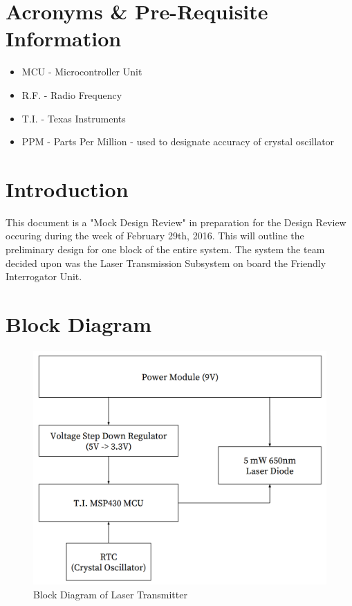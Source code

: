\documentclass[letterpaper,10pt]{article}
\newcommand{\buildtoc}{
	\clearpage
	\singlespacing
	\tableofcontents
	\onehalfspacing
}
\begin{document}
\maketitle
\pagestyle{fancy}
\begin{spacing}{1.15}


\color{black}
\buildtoc
{}
\section*{Acronyms \& Pre-Requisite Information}
\begin{itemize}
	\item MCU - Microcontroller Unit
	\item R.F. - Radio Frequency
	\item T.I. - Texas Instruments
	\item PPM - Parts Per Million - used to designate accuracy of crystal oscillator 
\end{itemize}
\clearpage
\setcounter{page}{1}

\section{Introduction}
This document is a "Mock Design Review" in preparation for the Design Review occuring during the week of February 29th, 2016. This will outline the preliminary design for one block of the entire system. The system the team decided upon was the Laser Transmission Subsystem on board the Friendly Interrogator Unit.

\section{Block Diagram}
\begin{figure} [H]
	\centering
	\includegraphics[scale=0.50]{Block_Diagram.png}
	\caption{Block Diagram of Laser Transmitter\label{fig:circuit-schematic}}
\end{figure}


\end{spacing}
\end{document}

